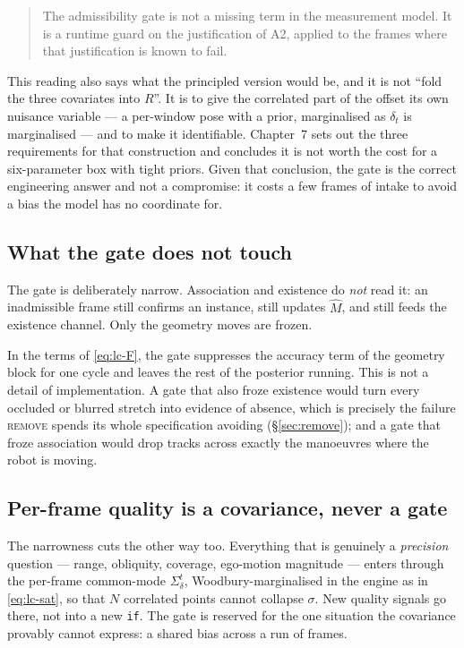 \documentclass[11pt,a4paper]{report}
\newcommand{\stage}[1]{\textsc{#1}}
\newcommand{\Remove}{\stage{remove}}
\begin{document}
\begin{quote}
The admissibility gate is not a missing term in the measurement model. It is a runtime guard on the
justification of A2, applied to the frames where that justification is known to fail.
\end{quote}

\noindent
This reading also says what the principled version would be, and it is not ``fold the three
covariates into $R$''. It is to give the correlated part of the offset its own nuisance variable ---
a per-window pose with a prior, marginalised as $\delta_t$ is marginalised --- and to make it
identifiable. Chapter~7 sets out the three requirements for that construction and concludes it is
not worth the cost for a six-parameter box with tight priors. Given that conclusion, the gate is the
correct engineering answer and not a compromise: it costs a few frames of intake to avoid a bias the
model has no coordinate for.

\subsection{What the gate does not touch}

The gate is deliberately narrow. Association and existence do \emph{not} read it: an inadmissible
frame still confirms an instance, still updates $\hat M$, and still feeds the existence channel.
Only the geometry moves are frozen.

In the terms of \eqref{eq:lc-F}, the gate suppresses the accuracy term of the geometry block for one
cycle and leaves the rest of the posterior running. This is not a detail of implementation. A gate
that also froze existence would turn every occluded or blurred stretch into evidence of absence,
which is precisely the failure \Remove{} spends its whole specification avoiding
(\S\ref{sec:remove}); and a gate that froze association would drop tracks across exactly the
manoeuvres where the robot is moving.

\subsection{Per-frame quality is a covariance, never a gate}

The narrowness cuts the other way too. Everything that is genuinely a \emph{precision} question ---
range, obliquity, coverage, ego-motion magnitude --- enters through the per-frame common-mode
$\Sigma_\delta^t$, Woodbury-marginalised in the engine as in \eqref{eq:lc-sat}, so that $N$
correlated points cannot collapse $\sigma$. New quality signals go there, not into a new \texttt{if}.
The gate is reserved for the one situation the covariance provably cannot express: a shared bias
across a run of frames.
\end{document}
